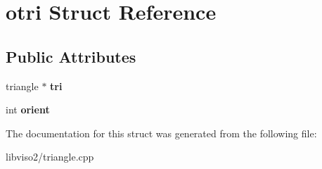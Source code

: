 \hypertarget{structotri}{\section{otri Struct Reference}
\label{structotri}
}
\subsection*{Public Attributes}
\begin{DoxyCompactItemize}
\item 
\hypertarget{structotri_a238238ab7eb61074eceb8382b6bdc835}{triangle $\ast$ {\bfseries tri}}\label{structotri_a238238ab7eb61074eceb8382b6bdc835}

\item 
\hypertarget{structotri_a3f79d64391ce76f64acc0aec04bf8805}{int {\bfseries orient}}\label{structotri_a3f79d64391ce76f64acc0aec04bf8805}

\end{DoxyCompactItemize}


The documentation for this struct was generated from the following file\+:\begin{DoxyCompactItemize}
\item 
libviso2/triangle.\+cpp\end{DoxyCompactItemize}
